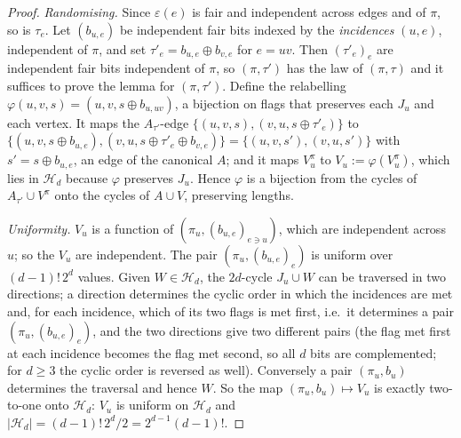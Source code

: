 \documentclass[11pt,a4paper]{article}
\theoremstyle{plain}
\theoremstyle{definition}
\theoremstyle{remark}
\newcommand{\cH}{\mathcal H}
\begin{document}
\begin{proof}
\emph{Randomising.} Since $\varepsilon(e)$ is fair and independent across edges and of $\pi$, so is $\tau_e$. Let $(b_{u,e})$ be independent fair bits indexed by the \emph{incidences} $(u,e)$, independent of $\pi$, and set $\tau'_e=b_{u,e}\oplus b_{v,e}$ for $e=uv$. Then $(\tau'_e)_e$ are independent fair bits independent of $\pi$, so $(\pi,\tau')$ has the law of $(\pi,\tau)$ and it suffices to prove the lemma for $(\pi,\tau')$. Define the relabelling $\varphi(u,v,s)=(u,v,s\oplus b_{u,uv})$, a bijection on flags that preserves each $J_u$ and each vertex. It maps the $A_{\tau'}$-edge $\{(u,v,s),(v,u,s\oplus\tau'_e)\}$ to $\{(u,v,s\oplus b_{u,e}),(v,u,s\oplus\tau'_e\oplus b_{v,e})\}=\{(u,v,s'),(v,u,s')\}$ with $s'=s\oplus b_{u,e}$, an edge of the canonical $A$; and it maps $V^\pi_u$ to $V_u:=\varphi(V^\pi_u)$, which lies in $\cH_d$ because $\varphi$ preserves $J_u$. Hence $\varphi$ is a bijection from the cycles of $A_{\tau'}\cup V^\pi$ onto the cycles of $A\cup V$, preserving lengths.

\emph{Uniformity.} $V_u$ is a function of $(\pi_u,(b_{u,e})_{e\ni u})$, which are independent across $u$; so the $V_u$ are independent. The pair $(\pi_u,(b_{u,e})_e)$ is uniform over $(d-1)!\,2^d$ values. Given $W\in\cH_d$, the $2d$-cycle $J_u\cup W$ can be traversed in two directions; a direction determines the cyclic order in which the incidences are met and, for each incidence, which of its two flags is met first, i.e.\ it determines a pair $(\pi_u,(b_{u,e})_e)$, and the two directions give two different pairs (the flag met first at each incidence becomes the flag met second, so all $d$ bits are complemented; for $d\ge3$ the cyclic order is reversed as well). Conversely a pair $(\pi_u,b_u)$ determines the traversal and hence $W$. So the map $(\pi_u,b_u)\mapsto V_u$ is exactly two-to-one onto $\cH_d$: $V_u$ is uniform on $\cH_d$ and $|\cH_d|=(d-1)!\,2^d/2=2^{d-1}(d-1)!$.
\end{proof}
\end{document}
